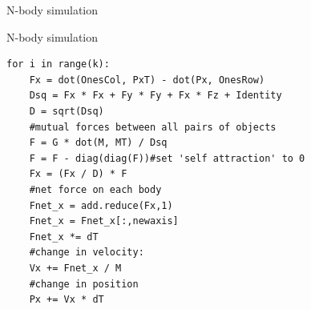 \documentclass{beamer}
\begin{document}




\begin{frame}[fragile]{N-body simulation}
\begin{center}
N-body simulation
\end{center}
\begin{scriptsize}
\begin{verbatim}
for i in range(k):
    Fx = dot(OnesCol, PxT) - dot(Px, OnesRow)
    Dsq = Fx * Fx + Fy * Fy + Fx * Fz + Identity
    D = sqrt(Dsq)
    #mutual forces between all pairs of objects
    F = G * dot(M, MT) / Dsq
    F = F - diag(diag(F))#set 'self attraction' to 0
    Fx = (Fx / D) * F
    #net force on each body
    Fnet_x = add.reduce(Fx,1)
    Fnet_x = Fnet_x[:,newaxis]
    Fnet_x *= dT
    #change in velocity:
    Vx += Fnet_x / M
    #change in position
    Px += Vx * dT
\end{verbatim}
\end{scriptsize}
\end{frame}

\end{document}

